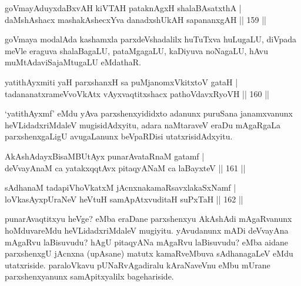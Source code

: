 
\begin{shl}
goVmayAduyxdaBxvAH kiVTAH pataknAgxH shalaBAsatxthA | \\
daMshAshacx mashakAshecxYva danadxshUkAH sapananxgAH \hfill|| 159 || 
\end{shl}

\begin{artha}
goVmaya modalAda kashamxla parxdeVshadalilx huTuTxva huLugaLU, diVpada meVle eraguva shalaBagaLU, pataMgagaLU, kaDiyuva noNagaLU, hAvu muMtAda\break viSajaMtugaLU eMdathaR.
\end{artha}


\begin{shl}
yatithAyxmiti yaH parxshanxH sa puMjanomxVkitxtoV gataH | \\
tadananatxrameVvoVkAtx vAyxvaqtitxshacx pathoVdavxRyoVH \hfill|| 160 || 
\end{shl}

\begin{artha}
`yatithAyxmf' eMdu yAva parxshenxyididxto adanunx puruSana janamxvanunx heVLidadxriMdaleV mugisidAdxyitu, adara naMtaraveV eraDu mAgaRgaLa parxshenxgaLigU avugaLanunx beVpaRDisi utatxrisidAdxyitu.
\end{artha}

\begin{shl}
AkAshAdayxBisaMBUtAyx punarAvataRnaM gatamf | \\
deVvayAnaM ca yatakxqqtAvx pitaqyANaM ca laBayxteV \hfill|| 161 || 
\end{shl}

\begin{shl}
sAdhanaM tadapiVhoVkatxM jAcnxnakamaRsavxlakaSxNamf | \\
loVkasAyxpUraNeV heVtuH samApAtxvuditaH suPxTaH \hfill|| 162 || 
\end{shl}

\begin{artha}
punarAvaqtitxyu heVge? eMba eraDane parxshenxyu AkAshAdi mAgaRvanunx hoMduvareMdu heVLidadxriMdaleV mugiyitu. yAvudanunx mADi deVvayAna mAgaRvu laBisuvudu? hAgU pitaqyANa mAgaRvu laBisuvudu? eMba aidane parxshenxgU jAcnxna (upAsane) matutx kamaRveMbuva sAdhanagaLeV eMdu utatxriside. paraloVkavu pUNaRvAgadiralu kAraNaveVnu eMbu mUrane parxshenxyanunx samApitxyalilx bagehariside.
\end{artha}

